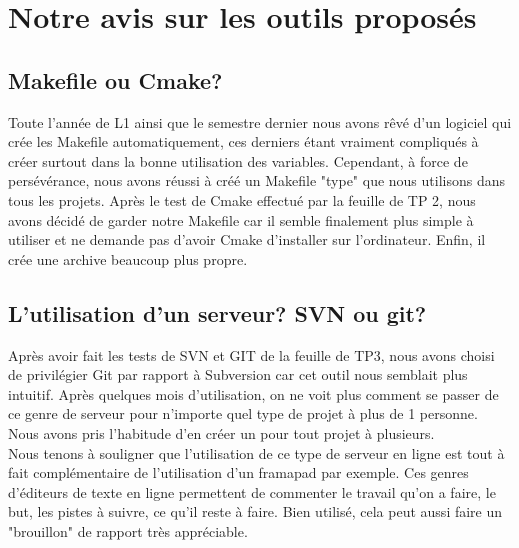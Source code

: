 \documentclass{report}
\begin{document}
\chapter{Notre avis sur les outils proposés}

\section{Makefile ou Cmake?}
Toute l'année de L1 ainsi que le semestre dernier nous avons rêvé d'un logiciel qui crée les Makefile automatiquement, ces derniers étant vraiment compliqués à créer surtout dans la bonne utilisation des variables. Cependant, à force de persévérance, nous avons réussi à créé un Makefile "type" que nous utilisons dans tous les projets. Après le test de Cmake effectué par la feuille de TP 2, nous avons décidé de garder notre Makefile car il semble finalement plus simple à utiliser et ne demande pas d'avoir Cmake d'installer sur l'ordinateur. Enfin, il crée une archive beaucoup plus propre.

\section{L'utilisation d'un serveur? SVN ou git?}
Après avoir fait les tests de SVN et GIT de la feuille de TP3, nous avons choisi de privilégier Git par rapport à Subversion car cet outil nous  semblait plus intuitif. Après quelques mois d'utilisation, on ne voit plus comment se passer de ce genre de serveur pour n'importe quel type de projet à plus de 1 personne. Nous avons pris l'habitude d'en créer un pour tout projet à plusieurs.\\
Nous tenons à souligner que l'utilisation de ce type de serveur en ligne est tout à fait complémentaire de l'utilisation d'un framapad par exemple. Ces genres d'éditeurs de texte en ligne permettent de commenter le travail qu'on a faire, le but, les pistes à suivre, ce qu'il reste à faire. Bien utilisé, cela peut aussi faire un "brouillon" de rapport très appréciable.
\end{document}

